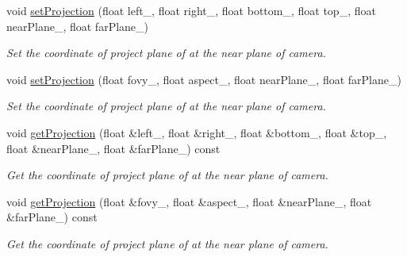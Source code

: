 \begin{DoxyCompactItemize}
void \hyperlink{class_magnum_1_1_perspective_camera_component_a6b49a13999f7fb6593ca845c10579795}{set\+Projection} (float left\+\_\+, float right\+\_\+, float bottom\+\_\+, float top\+\_\+, float near\+Plane\+\_\+, float far\+Plane\+\_\+)
\begin{DoxyCompactList}\small\item\em Set the coordinate of project plane of at the near plane of camera. \end{DoxyCompactList}\item 
void \hyperlink{class_magnum_1_1_perspective_camera_component_a4a3cc80a282ec870cb1343952b391940}{set\+Projection} (float fovy\+\_\+, float aspect\+\_\+, float near\+Plane\+\_\+, float far\+Plane\+\_\+)
\begin{DoxyCompactList}\small\item\em Set the coordinate of project plane of at the near plane of camera. \end{DoxyCompactList}\item 
void \hyperlink{class_magnum_1_1_perspective_camera_component_ae3ce00b7bbf1c9e9e073f28793dd1645}{get\+Projection} (float \&left\+\_\+, float \&right\+\_\+, float \&bottom\+\_\+, float \&top\+\_\+, float \&near\+Plane\+\_\+, float \&far\+Plane\+\_\+) const 
\begin{DoxyCompactList}\small\item\em Get the coordinate of project plane of at the near plane of camera. \end{DoxyCompactList}\item 
void \hyperlink{class_magnum_1_1_perspective_camera_component_a29352b75b672da73782d19fcc2e7b382}{get\+Projection} (float \&fovy\+\_\+, float \&aspect\+\_\+, float \&near\+Plane\+\_\+, float \&far\+Plane\+\_\+) const 
\begin{DoxyCompactList}\small\item\em Get the coordinate of project plane of at the near plane of camera. \end{DoxyCompactList}\end{DoxyCompactItemize}
